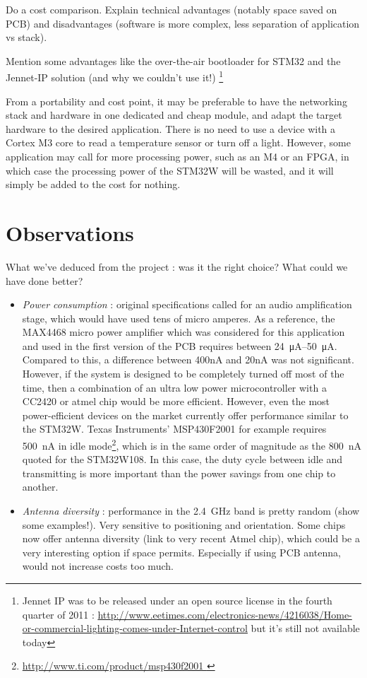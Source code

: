 Do a cost comparison. 
Explain technical advantages (notably space saved on PCB) and disadvantages
(software is more complex, less separation of application vs stack).

Mention some advantages like the over-the-air bootloader for STM32 and the
Jennet-IP solution (and why we couldn't use it!) \footnote{Jennet IP was to be
released under an open source license in the fourth quarter of 2011
: \url{http://www.eetimes.com/electronics-news/4216038/Home-or-commercial-lighting-comes-under-Internet-control}
but it's still not available today}



From a portability and cost point, it may be preferable to have the networking
stack and hardware in one dedicated and cheap module, and adapt the target
hardware to the desired application. There is no need to use a device with
a Cortex M3 core to read a temperature sensor or turn off a light. However, some
application may call for more processing power, such as an M4 or an FPGA, in
which case the processing power of the STM32W will be wasted, and it will simply
be added to the cost for nothing.

\section{Observations}

What we've deduced from the project : was it the right choice? What could we
have done better?

\begin{itemize}
  \item \emph{Power consumption} : original specifications called for an audio
    amplification stage, which would have used tens of micro amperes. As
    a reference, the MAX4468 micro power amplifier which was considered for this
    application and used in the first version of the PCB requires between
    \SIrange{24}{50}{\micro\ampere}. Compared to this, a difference between
    400nA and 20nA was not significant. However, if the system is designed to be
    completely turned off most of the time, then a combination of an ultra low
    power microcontroller with a CC2420 or atmel chip would be more efficient.
    However, even the most power-efficient devices on the market currently offer
    performance similar to the STM32W. Texas Instruments' MSP430F2001 for
    example requires \SI{500}{nA} in idle mode\footnote{ \url{
    http://www.ti.com/product/msp430f2001 }}, which is in the same order of
    magnitude as the \SI{800}{nA} quoted for the STM32W108. In this case, the
    duty cycle between idle and transmitting is more important than the power
    savings from one chip to another.
  \item \emph{Antenna diversity} : performance in the \SI{2.4}{GHz} band is pretty
    random (show some examples!). Very sensitive to positioning and orientation.
    Some chips now offer antenna diversity (link to very recent Atmel chip),
    which could be a very interesting option if space permits. Especially if
    using PCB antenna, would not increase costs too much.
\end{itemize}


